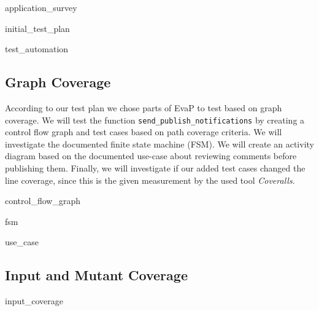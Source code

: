 {application_survey}

{initial_test_plan}

{test_automation}

\subsection{Graph Coverage}
\label{sec:graph-coverage}
According to our test plan we chose parts of EvaP to test based on graph coverage. 
We will test the function \texttt{send\_publish\_notifications} by creating a control flow graph and test cases based on path coverage criteria. 
We will investigate the documented finite state machine (FSM). 
We will create an activity diagram based on the documented use-case about reviewing comments before publishing them.
Finally, we will investigate if our added test cases changed the line coverage, since this is the given measurement by the used tool \textit{Coveralls}.

{control_flow_graph}

{fsm}

{use_case}

\subsection{Input and Mutant Coverage}
\label{sec:input-coverage}
{input_coverage}
